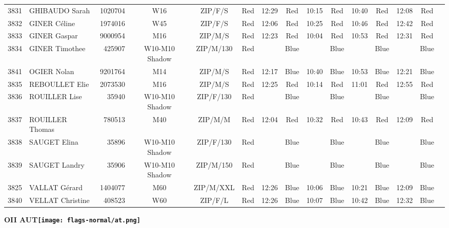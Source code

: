 \documentclass{report}
\begin{document}
\begin{longtable}{|c|l|r|c|c|*{5}{cc|}}
    3831 & GHIBAUDO Sarah & 1020704 & W16 & ZIP/F/S & Red & 12:29 & Red & 10:15 & Red & 10:40 & Red & 12:08 & Red &  \\
    3832 & GINER Céline & 1974016 & W45 & ZIP/F/S & Red & 12:06 & Red & 10:25 & Red & 10:46 & Red & 12:42 & Red &  \\
    3833 & GINER Gaspar & 9000954 & M16 & ZIP/M/S & Red & 12:23 & Red & 10:04 & Red & 10:53 & Red & 12:31 & Red &  \\
    3834 & GINER Timothee & 425907 & W10-M10 Shadow & ZIP/M/130 & Red &   & Blue &   & Blue &   & Blue &   & Blue &  \\
    3841 & OGIER Nolan & 9201764 & M14 & ZIP/M/S & Red & 12:17 & Blue & 10:40 & Blue & 10:53 & Blue & 12:21 & Blue &  \\
    3835 & REBOULLET Elie & 2073530 & M16 & ZIP/M/S & Red & 12:25 & Red & 10:14 & Red & 11:01 & Red & 12:55 & Red &  \\
    3836 & ROUILLER Lise & 35940 & W10-M10 Shadow & ZIP/F/130 & Red &   & Blue &   & Blue &   & Blue &   & Blue &  \\
    3837 & ROUILLER Thomas & 780513 & M40 & ZIP/M/M & Red & 12:04 & Red & 10:32 & Red & 10:43 & Red & 12:09 & Red &  \\
    3838 & SAUGET Elina & 35896 & W10-M10 Shadow & ZIP/F/130 & Red &   & Blue &   & Blue &   & Blue &   & Blue &  \\
    3839 & SAUGET Landry & 35906 & W10-M10 Shadow & ZIP/M/150 & Red &   & Blue &   & Blue &   & Blue &   & Blue &  \\
    3825 & VALLAT Gérard & 1404077 & M60 & ZIP/M/XXL & Red & 12:26 & Blue & 10:06 & Blue & 10:21 & Blue & 12:09 & Blue &  \\
    3840 & VELLAT Christine & 408523 & W60 & ZIP/F/L & Red & 12:26 & Blue & 10:07 & Blue & 10:42 & Blue & 12:32 & Blue &  \\
  \end{longtable}
\newpage
  \Huge \centering \bfseries OII  AUT\normalfont \footnotesize \sffamily \hfill \texttt{[image: flags-normal/at.png]} \newline 
\end{document}
